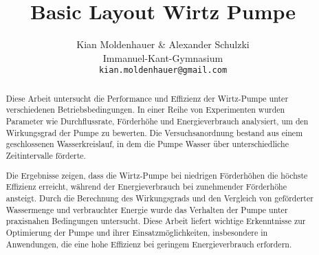 \documentclass[12pt]{article}
\begin{document}
\title{Basic Layout Wirtz Pumpe}
\author{Kian Moldenhauer & Alexander Schulzki\\Immanuel-Kant-Gymnasium\\\texttt{kian.moldenhauer@gmail.com}}
\date{\yesterday}
\maketitle

\begin{abstract}
Diese Arbeit untersucht die Performance und Effizienz der Wirtz-Pumpe unter verschiedenen Betriebsbedingungen. In einer Reihe von Experimenten wurden Parameter wie Durchflussrate, Förderhöhe und Energieverbrauch analysiert, um den Wirkungsgrad der Pumpe zu bewerten. Die Versuchsanordnung bestand aus einem geschlossenen Wasserkreislauf, in dem die Pumpe Wasser über unterschiedliche Zeitintervalle förderte.

Die Ergebnisse zeigen, dass die Wirtz-Pumpe bei niedrigen Förderhöhen die höchste Effizienz erreicht, während der Energieverbrauch bei zunehmender Förderhöhe ansteigt. Durch die Berechnung des Wirkungsgrads und den Vergleich von geförderter Wassermenge und verbrauchter Energie wurde das Verhalten der Pumpe unter praxisnahen Bedingungen untersucht. Diese Arbeit liefert wichtige Erkenntnisse zur Optimierung der Pumpe und ihrer Einsatzmöglichkeiten, insbesondere in Anwendungen, die eine hohe Effizienz bei geringem Energieverbrauch erfordern.\end{abstract}

\tableofcontents  %
\newpage          %
\end{document}

